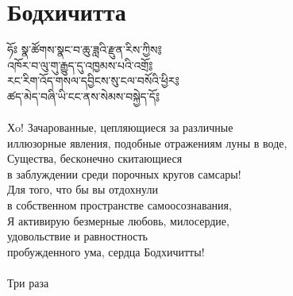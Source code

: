 \newpage

\section{Бодхичитта}

\ti
ཧོཿ སྣ་ཚོགས་སྣང་བ་ཆུ་ཟླའི་རྫུན་རིས་ཀྱིས༔\\
འཁོར་བ་ལུ་གུ་རྒྱུད་དུ་འཁྱམས་པའི་འགྲོ༔\\
རང་རིག་འོད་གསལ་དབྱིངས་སུ་ངལ་བསོའི་ཕྱིར༔\\
ཚད་མེད་བཞི་ཡི་ངང་ནས་སེམས་བསྐྱེད་དོ༔\\
\\
\ru
Хo! Зачарованные, цепляющиеся за различные \\
\indent иллюзорные явления, подобные отражениям луны в воде,\\
Существа, бесконечно скитающиеся\\
\indent в заблуждении среди порочных кругов самсары!\\
Для того, что бы вы отдохнули\\
\indent в собственном пространстве самоосознавания,\\
Я активирую безмерные любовь, милосердие,\\
\indent удовольствие и равностность\\
\indent пробужденного ума, сердца Бодхичитты!\\
\\
Три раза
